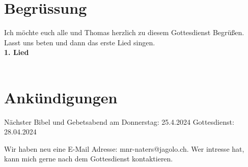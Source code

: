 \section{Begrüssung}
Ich möchte euch alle und Thomas herzlich zu diesem Gottesdienst Begrüßen. Lasst uns beten und dann das erste Lied singen.
\\
\textbf{1. Lied}
\\ 
\\
\section{Ankündigungen}
Nächster Bibel und Gebetsabend am Donnerstag: 25.4.2024
Gottesdienst: 28.04.2024

Wir haben neu eine E-Mail Adresse: mnr-naters@jagolo.ch. Wer intresse hat, kann mich gerne nach dem Gottesdienst kontaktieren.

